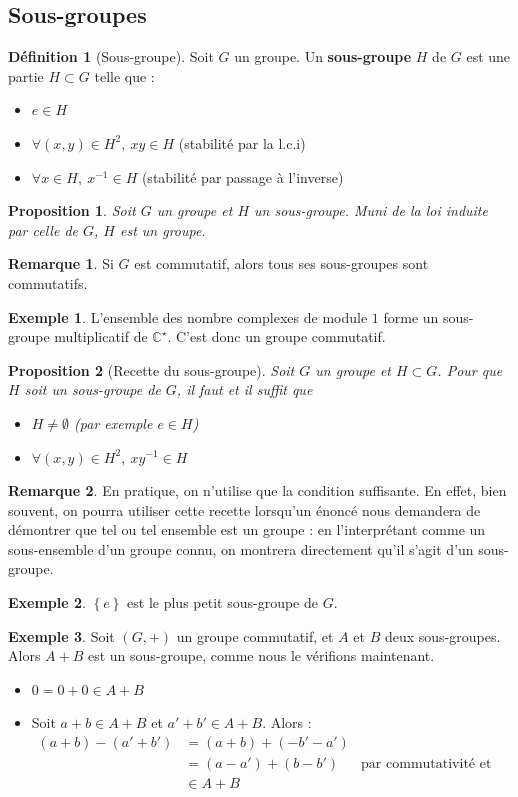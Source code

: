 \documentclass[french]{book}
\newcommand{\C}{\mathbb{C}}
\newcommand{\st}{^\star}
\newcommand{\inv}{^{-1}}
\theoremstyle{plain}
\newtheorem{prop}{Proposition}[chapter]
\theoremstyle{definition}
\newtheorem{dfn}{Définition}[chapter]
\newtheorem{exa}{Exemple}[chapter]
\newtheorem{rmq}{Remarque}[chapter]
\theoremstyle{remark}
\begin{document}
\subsection{Sous-groupes}
\begin{dfn}[Sous-groupe]
	Soit $G$ un groupe. Un \textbf{sous-groupe} $H$ de $G$ est une partie $H\subset G$ telle que :
	\begin{itemize}
		\item $e\in H$
		\item $\forall (x,y)\in H^2,\ xy\in H$ (stabilité par la l.c.i)
		\item $\forall x\in H,\ x\inv\in H$ (stabilité par passage à l'inverse)
	\end{itemize}
\end{dfn}
\begin{prop}
	Soit $G$ un groupe et $H$ un sous-groupe. Muni de la loi induite par celle de $G$, $H$ est un groupe.
\end{prop}
\begin{rmq}
	Si $G$ est commutatif, alors tous ses sous-groupes sont commutatifs.
\end{rmq}
\begin{exa}
	L'ensemble des nombre complexes de module $1$ forme un sous-groupe multiplicatif de $\C\st$. C'est donc un groupe commutatif.
\end{exa}
\begin{prop}[Recette du sous-groupe]
	Soit $G$ un groupe et $H\subset G$. Pour que $H$ soit un sous-groupe de $G$, il faut et il suffit que \begin{itemize}
		\item $H\ne\emptyset$ (par exemple $e\in H$)
		\item $\forall(x,y)\in H^2,\ xy\inv\in H$
	\end{itemize}
\end{prop}
\begin{rmq}
	En pratique, on n'utilise que la condition suffisante. En effet, bien souvent, on pourra utiliser cette recette lorsqu'un énoncé nous demandera de démontrer que tel ou tel ensemble est un groupe : en l'interprétant comme un sous-ensemble d'un groupe connu, on montrera directement qu'il s'agit d'un sous-groupe.
\end{rmq}
\begin{exa}
	$\left\{e\right\}$ est le plus petit sous-groupe de $G$.
\end{exa}
\begin{exa}
	Soit $(G,+)$ un groupe commutatif, et $A$ et $B$ deux sous-groupes. Alors $A+B$ est un sous-groupe, comme nous le vérifions maintenant.
	\begin{itemize}
		\item $0=0+0\in A+B$
		\item Soit $a+b\in A+B$ et $a'+b'\in A+B$. Alors :
		\begin{align*}
			(a+b)-(a'+b')&=(a+b)+(-b'-a') \\
			&= (a-a')+(b-b')&\text{par commutativité et associativité} \\
			&\in A+B
		\end{align*}
	\end{itemize}
\end{exa}
\end{document}
